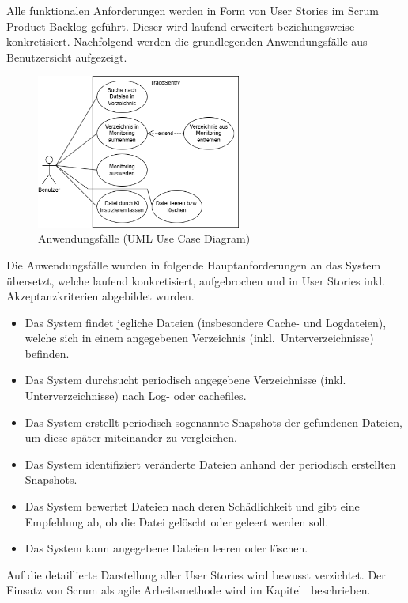 \documentclass[a4paper,12pt]{report}
\begin{document}
    Alle funktionalen Anforderungen werden in Form von User Stories im Scrum Product Backlog geführt.
    Dieser wird laufend erweitert beziehungsweise konkretisiert.
    Nachfolgend werden die grundlegenden Anwendungsfälle aus Benutzersicht aufgezeigt.
    \begin{figure}[h]
        \centering
        \includegraphics[width=0.6\textwidth]{assets/usecase}
        \caption{Anwendungsfälle (UML Use Case Diagram)}
        \label{fig:usecase}
    \end{figure}
    Die Anwendungsfälle wurden in folgende Hauptanforderungen an das System übersetzt,
    welche laufend konkretisiert, aufgebrochen und in User Stories inkl. Akzeptanzkriterien abgebildet wurden.
    \begin{itemize}
        \item Das System findet jegliche Dateien (insbesondere Cache- und Logdateien), welche sich in einem angegebenen Verzeichnis (inkl.\ Unterverzeichnisse) befinden.
        \item Das System durchsucht periodisch angegebene Verzeichnisse (inkl.
        Unterverzeichnisse) nach Log- oder \gls{cachefiles}.
        \item Das System erstellt periodisch sogenannte Snapshots der gefundenen Dateien, um diese später miteinander zu vergleichen.
        \item Das System identifiziert veränderte Dateien anhand der periodisch erstellten Snapshots.
        \item Das System bewertet Dateien nach deren Schädlichkeit und gibt eine Empfehlung ab, ob die Datei gelöscht oder geleert werden soll.
        \item Das System kann angegebene Dateien leeren oder löschen.
    \end{itemize}
    Auf die detaillierte Darstellung aller User Stories wird bewusst verzichtet.
    Der Einsatz von Scrum als agile Arbeitsmethode wird im Kapitel~ beschrieben.
\end{document}
